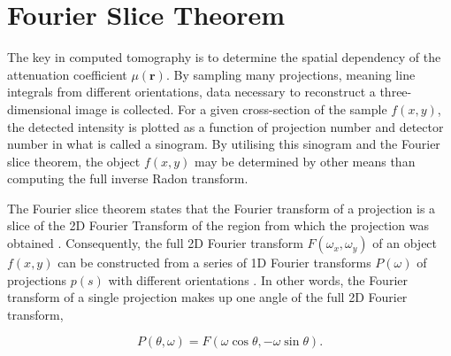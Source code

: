 
\section{Fourier Slice Theorem}
The key in computed tomography is to determine the spatial dependency of the attenuation coefficient $\mu(\bm{r})$.
By sampling many projections, meaning line integrals from different orientations, data necessary to reconstruct a three-dimensional image is collected.
For a given cross-section of the sample $f(x, y)$, the detected intensity is plotted as a function of projection number and detector number in what is called a sinogram.
By utilising this sinogram and the Fourier slice theorem, the object $f(x, y)$ may be determined by other means than computing the full inverse Radon transform.

The Fourier slice theorem states that the Fourier transform of a projection
is a slice of the 2D Fourier Transform of the region from which the projection was obtained \cite{gonzalez2018digital}.
Consequently, the full 2D Fourier transform
$F(\omega_x, \omega_y)$ of an object $f(x,y)$ can be constructed from a series of 1D Fourier transforms
$P(\omega)$ of projections $p(s)$ with different orientations \cite{zeng2010medical}.
In other words, the Fourier transform of a single projection makes up one angle of the full 2D Fourier transform,

\begin{equation}\label{eq:Fourier_slice}
    P(\theta, \omega) = F \left( \omega \cos \theta, -\omega \sin \theta \right). %
\end{equation}




